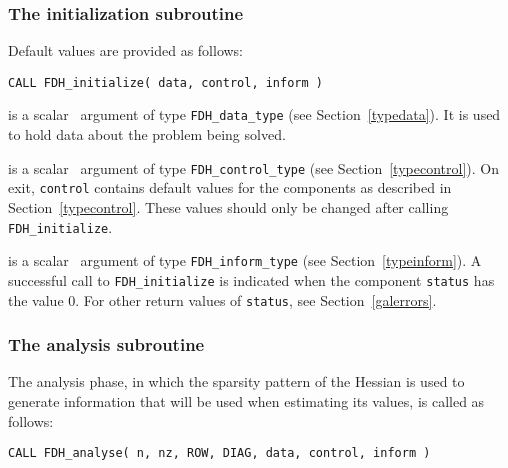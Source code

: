 \documentclass{galahad}
\newcommand{\packagename}{FDH}
\begin{document}

\subsubsection{The initialization subroutine}\label{subinit}
 Default values are provided as follows:
\vspace*{1mm}

\hspace{8mm}
{\tt CALL \packagename\_initialize( data, control, inform )}

\vspace*{-3mm}
\begin{description}

 is a scalar \intentinout\ argument of type 
{\tt \packagename\_data\_type}
(see Section~\ref{typedata}). It is used to hold data about the problem being 
solved. 

 is a scalar \intentout\ argument of type 
{\tt \packagename\_control\_type}
(see Section~\ref{typecontrol}). 
On exit, {\tt control} contains default values for the components as
described in Section~\ref{typecontrol}.
These values should only be changed after calling 
{\tt \packagename\_initialize}.

 is a scalar \intentout\ argument of type 
{\tt \packagename\_inform\_type}
(see Section~\ref{typeinform}). A successful call to
{\tt \packagename\_initialize}
is indicated when the  component {\tt status} has the value 0. 
For other return values of {\tt status}, see Section~\ref{galerrors}.

\end{description}


\subsubsection{The analysis subroutine}
The analysis phase, in which the sparsity pattern of the Hessian
is used to generate information that will be used when estimating 
its values, is called as follows:

\vspace*{1mm}

\hspace{8mm}
{\tt CALL \packagename\_analyse( n, nz, ROW, DIAG, data, control, inform )}
\end{document}
